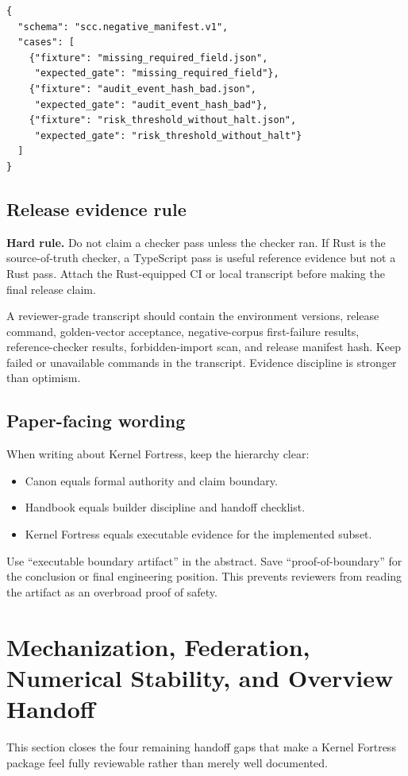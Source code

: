 \documentclass[11pt,oneside]{article}
\newenvironment{rulebox}{\begin{shaded}\noindent\textbf{Hard rule.} }{\end{shaded}}
\begin{document}
\begin{lstlisting}[caption={Minimum negative-corpus manifest shape.}]
{
  "schema": "scc.negative_manifest.v1",
  "cases": [
    {"fixture": "missing_required_field.json",
     "expected_gate": "missing_required_field"},
    {"fixture": "audit_event_hash_bad.json",
     "expected_gate": "audit_event_hash_bad"},
    {"fixture": "risk_threshold_without_halt.json",
     "expected_gate": "risk_threshold_without_halt"}
  ]
}
\end{lstlisting}

\subsection{Release evidence rule}
\begin{rulebox}
Do not claim a checker pass unless the checker ran. If Rust is the source-of-truth checker, a TypeScript pass is useful reference evidence but not a Rust pass. Attach the Rust-equipped CI or local transcript before making the final release claim.
\end{rulebox}

A reviewer-grade transcript should contain the environment versions, release command, golden-vector acceptance, negative-corpus first-failure results, reference-checker results, forbidden-import scan, and release manifest hash. Keep failed or unavailable commands in the transcript. Evidence discipline is stronger than optimism.

\subsection{Paper-facing wording}
When writing about Kernel Fortress, keep the hierarchy clear:
\begin{itemize}
  \item Canon equals formal authority and claim boundary.
  \item Handbook equals builder discipline and handoff checklist.
  \item Kernel Fortress equals executable evidence for the implemented subset.
\end{itemize}

Use ``executable boundary artifact'' in the abstract. Save ``proof-of-boundary'' for the conclusion or final engineering position. This prevents reviewers from reading the artifact as an overbroad proof of safety.


\section{Mechanization, Federation, Numerical Stability, and Overview Handoff}
This section closes the four remaining handoff gaps that make a Kernel Fortress package feel fully reviewable rather than merely well documented.
\end{document}
